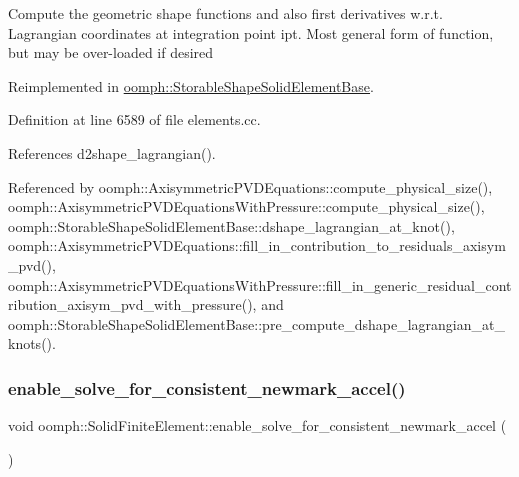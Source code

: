 Compute the geometric shape functions and also first derivatives w.\+r.\+t. Lagrangian coordinates at integration point ipt. Most general form of function, but may be over-\/loaded if desired 

Reimplemented in \hyperlink{classoomph_1_1StorableShapeSolidElementBase_a69eefa335919d8d4b5143bb11b40c2df}{oomph\+::\+Storable\+Shape\+Solid\+Element\+Base}.



Definition at line 6589 of file elements.\+cc.



References d2shape\+\_\+lagrangian().



Referenced by oomph\+::\+Axisymmetric\+P\+V\+D\+Equations\+::compute\+\_\+physical\+\_\+size(), oomph\+::\+Axisymmetric\+P\+V\+D\+Equations\+With\+Pressure\+::compute\+\_\+physical\+\_\+size(), oomph\+::\+Storable\+Shape\+Solid\+Element\+Base\+::dshape\+\_\+lagrangian\+\_\+at\+\_\+knot(), oomph\+::\+Axisymmetric\+P\+V\+D\+Equations\+::fill\+\_\+in\+\_\+contribution\+\_\+to\+\_\+residuals\+\_\+axisym\+\_\+pvd(), oomph\+::\+Axisymmetric\+P\+V\+D\+Equations\+With\+Pressure\+::fill\+\_\+in\+\_\+generic\+\_\+residual\+\_\+contribution\+\_\+axisym\+\_\+pvd\+\_\+with\+\_\+pressure(), and oomph\+::\+Storable\+Shape\+Solid\+Element\+Base\+::pre\+\_\+compute\+\_\+dshape\+\_\+lagrangian\+\_\+at\+\_\+knots().

\mbox{\label{classoomph_1_1SolidFiniteElement_a48f5caa032de704bf2ce6efc777c7fe2}} 
\subsubsection{\texorpdfstring{enable\+\_\+solve\+\_\+for\+\_\+consistent\+\_\+newmark\+\_\+accel()}{enable\_solve\_for\_consistent\_newmark\_accel()}}
{\footnotesize\ttfamily void oomph\+::\+Solid\+Finite\+Element\+::enable\+\_\+solve\+\_\+for\+\_\+consistent\+\_\+newmark\+\_\+accel (\begin{DoxyParamCaption}{ }\end{DoxyParamCaption})\hspace{0.3cm}{\ttfamily [inline]}}



